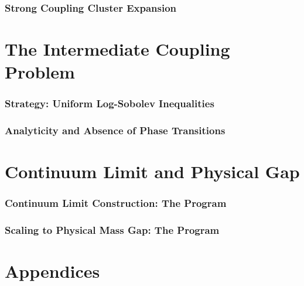 \documentclass[11pt,a4paper]{article}
\begin{document}
\section{Strong Coupling Cluster Expansion}



\part{The Intermediate Coupling Problem}
\label{part:intermediate}

\section{Strategy: Uniform Log-Sobolev Inequalities}


\section{Analyticity and Absence of Phase Transitions}



\part{Continuum Limit and Physical Gap}
\label{part:continuum}

\section{Continuum Limit Construction: The Program}


\section{Scaling to Physical Mass Gap: The Program}



\part{Appendices}
\appendix









\end{document}
